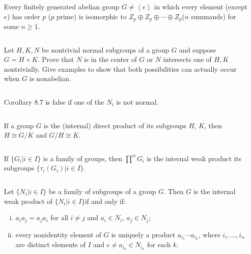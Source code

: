 $$ $$

\begin{ex}
    Every finitely generated abelian group $G\neq\left\langle e\right\rangle$ in which every element (except $e$) has order $p$ ($p$ prime) is isomorphic to $Z_{p}\oplus Z_{p}\oplus\cdots\oplus Z_{p}$($n$ summands) for some $n\geq 1$.
\end{ex}

$$ $$

\begin{ex}
    Let $H,K,N$ be nontrivial normal subgroups of a group $G$ and suppose $G=H\times K$. Prove that $N$ is in the center of $G$ or $N$ intersects one of $H,K$ nontrivially. Give examples to show that both possibilities can actually occur when $G$ is nonabelian.
\end{ex}

$$ $$

\begin{ex}
    Corollary 8.7 is false if one of the $N_{i}$ is not normal.
\end{ex}

$$ $$

\begin{ex}
    If a group $G$ is the (internal) direct product of its subgroups $H$, $K$, then $H\cong G / K$ and $G /H \cong K$.
\end{ex}

$$ $$

\begin{ex}
    If $\{G_{i}|i\in I\}$ is a family of groups, then $\prod^{w}G_{i}$ is the internal weak product its subgroups $\{\tau_{i}(G_{i})|i\in I\}$.
\end{ex}

$$ $$

\begin{ex}
    Let $\{N_{i}|i\in I\}$ be a family of subgroups of a group $G$. Then $G$ is the internal weak product of $\{N_{i}|i\in I\}$if and only if:
    \begin{enumerate}[(i)]
        \item $a_{i}a_{j}=a_{j}a_{i}$ for all $i\neq j$ and $a_{i}\in N_{i}$, $a_{j}\in N_{j}$;
        \item every nonidentity element of $G$ is uniquely a product $a_{i_{1}}\cdots a_{i_{n}}$, where $i_{i},\dots,i_{n}$ are distinct elements of $I$ and $e\neq a_{i_{k}}\in N_{i_{k}}$ for each $k$.
    \end{enumerate}
\end{ex}

